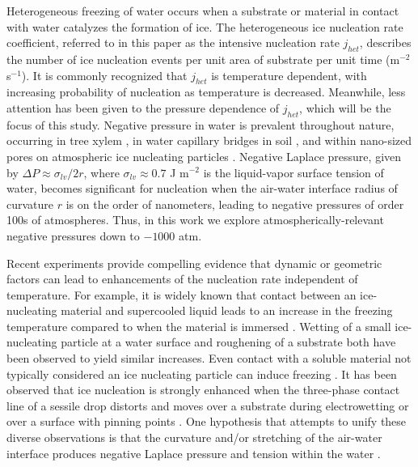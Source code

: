 \documentclass[journal abbreviation, manuscript]{copernicus}
\begin{document}
\introduction

Heterogeneous freezing of water occurs when a substrate or material in contact with water catalyzes the formation of ice. The heterogeneous ice nucleation rate coefficient, referred to in this paper as the intensive nucleation rate $j_{het}$, describes the number of ice nucleation events per unit area of substrate per unit time (m$^{-2}$ s$^{-1}$). It is commonly recognized that $j_{het}$ is temperature dependent, with increasing probability of nucleation as temperature is decreased. Meanwhile, less attention has been given to the pressure dependence of $j_{het}$, which will be the focus of this study. Negative pressure in water is prevalent throughout nature, occurring in tree xylem \citep{jacobsen2007xylem}, in water capillary bridges in soil \citep{seiphoori2020}, and within nano-sized pores on atmospheric ice nucleating particles \citep{david2020role,marcolli2020technical,klumpp2023comparing}. Negative Laplace pressure, given by $\Delta P \approx \sigma_{lv}/2r$, where $\sigma_{lv} \approx 0.7$ J m$^{-2}$ is the liquid-vapor surface tension of water, becomes significant for nucleation when the air-water interface radius of curvature $r$ is on the order of nanometers, leading to negative pressures of order 100s of atmospheres. Thus, in this work we explore atmospherically-relevant negative pressures down to $-1000$ atm. %

Recent experiments provide compelling evidence that dynamic or geometric factors can lead to enhancements of the nucleation rate independent of temperature. For example, it is widely known that contact between an ice-nucleating material and supercooled liquid leads to an increase in the freezing temperature compared to when the material is immersed \citep{pitter1973wind,levin1983contact,diehl2002ice}. Wetting of a small ice-nucleating particle at a water surface \citep{shaw2005} and roughening of a substrate \citep{gurganus2014nucleation} both have been observed to yield similar increases. Even contact with a soluble material not typically considered an ice nucleating particle can induce freezing \citep{niehaus2015}. It has been observed that ice nucleation is strongly enhanced when the three-phase contact line of a sessile drop distorts and moves over a substrate during electrowetting \citep{yang2015} or over a surface with pinning points \citep{yang2018}. One hypothesis that attempts to unify these diverse observations is that the curvature and/or stretching of the air-water interface produces negative Laplace pressure and tension within the water \citep{marcolli2017,yang2020}. 
\end{document}
